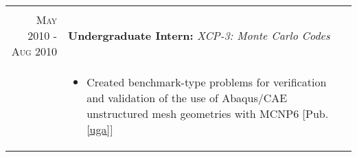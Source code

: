 \begin{tabular}{r|p{13.7cm}}
{\begin{itemize}[leftmargin=4mm]
	\end{itemize}
 \vspace{-2.0mm}  
 } \\
 
  \textsc{May 2010 - Aug 2010}  & \textbf{Undergraduate Intern:} \textit{XCP-3: Monte Carlo Codes} \\
      & \small{ \vspace{-2.0mm} 
 \begin{itemize}[leftmargin=4mm]
	\item Created benchmark-type problems for verification and
		  validation of the use of Abaqus/CAE unstructured mesh 
		  geometries with MCNP6 [Pub. \ref{uga}]
 
 \end{itemize}
 \vspace{-4.5mm}
 } \\



\end{tabular}

